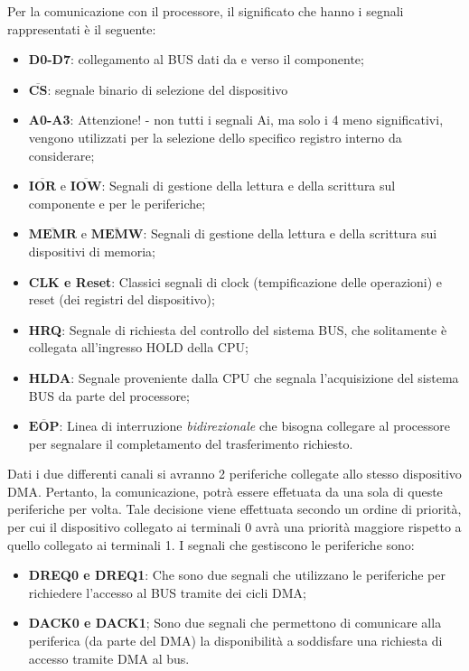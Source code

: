 Per la comunicazione con il processore, il significato che hanno i segnali rappresentati è il seguente:
\begin{itemize}
    \item \textbf{D0-D7}: collegamento al BUS dati da e verso il componente;
    \item $\overline{\mathbf{CS}}$: segnale binario di selezione del dispositivo
    \item \textbf{A0-A3}: Attenzione! - non tutti i segnali Ai, ma solo i 4 meno significativi, vengono utilizzati per la selezione dello specifico registro interno da considerare;
    \item $\overline{\mathbf{IOR}}$ e $\overline{\mathbf{IOW}}$: Segnali di gestione della lettura e della scrittura sul componente e per le periferiche;
    \item $\overline{\mathbf{MEMR}}$ e $\overline{\mathbf{MEMW}}$: Segnali di gestione della lettura e della scrittura sui dispositivi di memoria;
    \item \textbf{CLK e Reset}: Classici segnali di clock (tempificazione delle operazioni) e reset (dei registri del dispositivo);
    \item \textbf{HRQ}: Segnale di richiesta del controllo del sistema BUS, che solitamente è collegata all'ingresso HOLD della CPU;
    \item \textbf{HLDA}: Segnale proveniente dalla CPU che segnala l'acquisizione del sistema BUS da parte del processore;
    \item  $\overline{\mathbf{EOP}}$: Linea di interruzione \textit{bidirezionale} che bisogna collegare al processore per segnalare il completamento del trasferimento richiesto.
\end{itemize}

Dati i due differenti canali si avranno 2 periferiche collegate allo stesso dispositivo DMA. Pertanto, la comunicazione, potrà essere effetuata da una sola di queste periferiche per volta. Tale decisione viene effettuata secondo un ordine di priorità, per cui il dispositivo collegato ai terminali 0 avrà una priorità maggiore rispetto a quello collegato ai terminali 1. I segnali che gestiscono le periferiche sono:
\begin{itemize}
    \item \textbf{DREQ0 e DREQ1}: Che sono due segnali che utilizzano le periferiche per richiedere l'accesso al BUS tramite dei cicli DMA;
    \item \textbf{DACK0 e DACK1}; Sono due segnali che permettono di comunicare alla periferica (da parte del DMA) la disponibilità a soddisfare una richiesta di accesso tramite DMA al bus.
\end{itemize}

